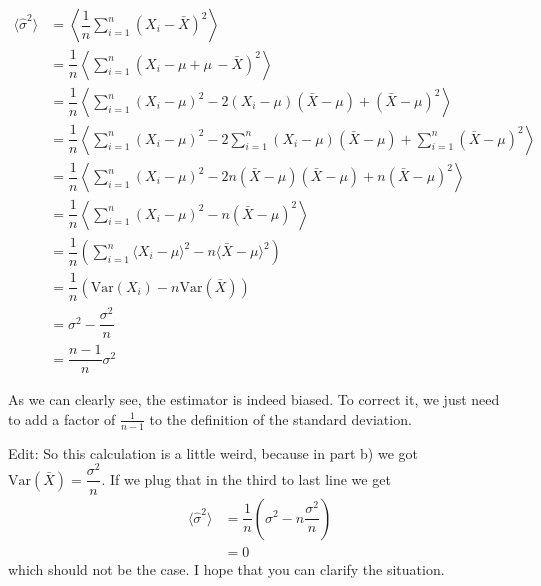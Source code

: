 \begin{align*}
    \langle \hat{\sigma}^2 \rangle    &= \left\langle \dfrac{1}{n} \sum_{i=1}^n (X_i - \bar{X})^2 \right\rangle \\
                                &= \dfrac{1}{n} \left\langle  \sum_{i=1}^n (X_i - \mu + \mu \, - \bar{X})^2 \right\rangle \\ 
                                &= \dfrac{1}{n} \left\langle  \sum_{i=1}^n (X_i - \mu)^2 -2(X_i -\mu)(\bar{X} - \mu) + (\bar{X} - \mu)^2 \right\rangle \\
                                &= \dfrac{1}{n} \left\langle  \sum_{i=1}^n ( X_i - \mu)^2 -2 \sum_{i=1}^n (X_i -\mu)(\bar{X} - \mu) + \sum_{i=1}^n(\bar{X} - \mu)^2 \right\rangle  \\
                                &= \dfrac{1}{n} \left\langle  \sum_{i=1}^n ( X_i - \mu)^2 -2n(\bar{X} -\mu)(\bar{X} - \mu) + n(\bar{X} - \mu)^2 \right\rangle  \\
                                &= \dfrac{1}{n} \left\langle  \sum_{i=1}^n ( X_i - \mu)^2 -n(\bar{X} - \mu)^2 \right\rangle  \\
                                &= \dfrac{1}{n} \left( \sum_{i=1}^n \langle X_i - \mu \rangle^2 -n\langle\bar{X} -\mu \rangle^2 \right) \\
                                &= \dfrac{1}{n} \left( \text{Var}(X_i) -n \text{Var}(\bar{X})\right)  \\
                                &= \sigma^2 - \dfrac{\sigma^2}{n}   \\
                                &= \dfrac{n-1}{n} \sigma^2                               
\end{align*}

As we can clearly see, the estimator is indeed biased. To correct it, we just need to add a factor of $\frac{1}{n-1}$ to the definition of the standard deviation.

Edit: So this calculation is a little weird, because in part b) we got  $\text{Var}(\bar{X}) = \dfrac{\sigma^2}{n}$. If we plug that in the third to last line we get
\begin{align*}
    \langle \hat{\sigma}^2 \rangle    &= \dfrac{1}{n} \left( \sigma^2 - n \dfrac{\sigma^2}{n} \right)\\
                                      &= 0 \, 
\end{align*}
which should not be the case. I hope that you can clarify the situation.